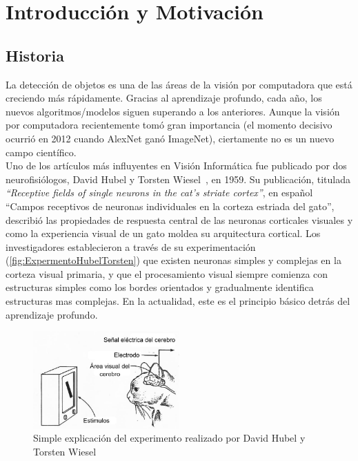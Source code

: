 \chapter{Introducción y Motivación} \label{cap:intro}

\section{Historia} \label{sec:historia}
La detección de objetos es una de las áreas de la visión por computadora que está creciendo más rápidamente. Gracias al aprendizaje profundo, cada año, los nuevos algoritmos/modelos siguen superando a los anteriores. Aunque la visión por computadora recientemente tomó gran importancia (el momento decisivo ocurrió en 2012 cuando AlexNet ganó ImageNet), ciertamente no es un nuevo campo científico.\\

Uno de los artículos más influyentes en Visión Informática fue publicado por dos neurofisiólogos, David Hubel y Torsten Wiesel~\cite{hubel1959receptive}, en 1959. Su publicación, titulada \textit{``Receptive fields of single neurons in the cat’s striate cortex''}, en español ``Campos receptivos de neuronas individuales en la corteza estriada del gato'', describió las propiedades de respuesta central de las neuronas corticales visuales y como la experiencia visual de un gato moldea su arquitectura cortical. Los investigadores establecieron a través de su experimentación (\autoref{fig:ExpermentoHubelTorsten}) que existen neuronas simples y complejas en la corteza visual primaria, y que el procesamiento visual siempre comienza con estructuras simples como los bordes orientados y gradualmente identifica estructuras mas complejas. En la actualidad, este es el principio básico detrás del aprendizaje profundo.\\

\begin{figure}
	\centering
	\includegraphics[width=0.5\textwidth]{img/cat.jpg}
	\caption{Simple explicación del experimento realizado por David Hubel y Torsten Wiesel}
	\label{fig:ExpermentoHubelTorsten}
\end{figure}


